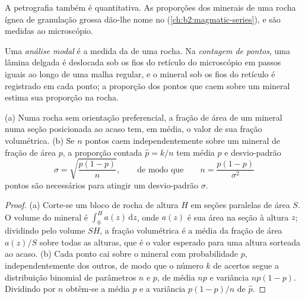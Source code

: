A petrografia também é quantitativa. As proporções dos minerais de uma rocha ígnea de granulação grossa
dão-lhe nome no  (\cref{ch:b2:magmatic-series}), e são medidas ao
microscópio.

\begin{definition}\label{def:b2:field-lab-methods-2:modal}
Uma \emph{análise modal} é a medida da  de uma
rocha. Na \emph{contagem de pontos}, uma lâmina
delgada é deslocada sob os fios do retículo do microscópio em passos iguais ao longo de uma malha regular, e
o mineral sob os fios do retículo é registrado em cada ponto; a proporção dos pontos que
caem sobre um mineral estima sua proporção na rocha.
\end{definition}

\begin{proposition}\label{prop:b2:field-lab-methods-2:counting}
(a) Numa rocha sem orientação preferencial, a fração de área de um mineral numa seção posicionada
ao acaso tem, em média, o valor de sua fração volumétrica. (b) Se $n$ pontos caem independentemente
sobre um mineral de fração de área $p$, a proporção contada $\hat p = k/n$ tem média $p$ e
desvio-padrão
\begin{equation}
\sigma = \sqrt{\frac{p(1-p)}{n}} , \qquad\text{de modo que}\qquad n = \frac{p(1-p)}{\sigma^2}
\label{eq:b2:field-lab-methods-2:binomial}
\end{equation}
pontos são necessários para atingir um desvio-padrão $\sigma$.
\end{proposition}

\begin{proof}
(a) Corte-se um bloco de rocha de altura $H$ em seções paralelas de área $S$. O volume do
mineral é $\int_0^H a(z)\,\mathrm{d}z$, onde $a(z)$ é sua área na seção à altura $z$;
dividindo pelo volume $SH$, a fração volumétrica é a média da fração de área $a(z)/S$ sobre
todas as alturas, que é o valor esperado para uma altura sorteada ao acaso. (b) Cada ponto cai sobre o
mineral com probabilidade $p$, independentemente dos outros, de modo que o número $k$ de acertos segue a
distribuição binomial de parâmetros $n$ e $p$, de média $np$ e variância $np(1-p)$. Dividindo por
$n$ obtêm-se a média $p$ e a variância $p(1-p)/n$ de $\hat p$.
\end{proof}

